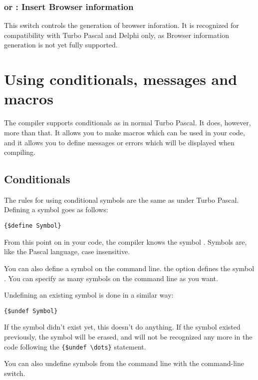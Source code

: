 \subsection{ or  : Insert Browser information}

This switch controls the generation of browser inforation. It is recognized
for compatibility with Turbo Pascal and Delphi only, as Browser information
generation is not yet fully supported.


\chapter{Using conditionals, messages and macros}
\label{ch:CondMessageMacro}
The \fpc compiler supports conditionals as in normal Turbo Pascal. It does,
however, more than that. It allows you to make macros which can be used in
your code, and it allows you to define messages or errors which will be
displayed when compiling.

\section{Conditionals}
\label{se:Conditionals}
The rules for using conditional symbols are the same as under Turbo Pascal.
Defining a symbol goes as follows:
\begin{verbatim}
{$define Symbol}
\end{verbatim}
From this point on in your code, the compiler knows the symbol .
Symbols are, like the Pascal language, case insensitive.

You can also define a symbol on the command line. the  option
defines the symbol . You can specify as many symbols on the
command line as you want.

Undefining an existing symbol is done in a similar way:
\begin{verbatim}
{$undef Symbol}
\end{verbatim}
If the symbol didn't exist yet, this doesn't do anything. If the symbol
existed previously, the symbol will be erased, and will not be recognized
any more in the code following the \verb|{$undef \dots}| statement.

You can also undefine symbols from the command line with the 
command-line switch.

